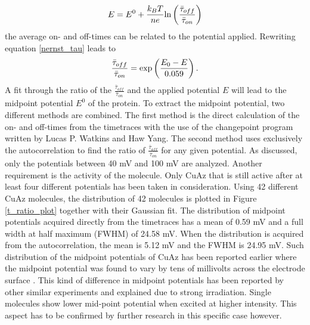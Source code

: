\documentclass[twoside,single]{lion-msc}
\begin{document}
\begin{equation}\label{nernst_tau}
E = E^{0}+\frac{k_{B}T}{ne}\textup{ln}\left ( \frac{\bar{\tau}_{off}}{\bar{\tau}_{on}} \right )
\end{equation}
the average on- and off-times can be related to the potential applied. Rewriting equation \ref{nernst_tau} leads to
\begin{equation}\label{fit_onoff}
\frac{\bar{\tau}_{off}}{\bar{\tau}_{on}} = \textup{exp}\left ( \frac{E_{0}-E}{0.059} \right ).
\end{equation}
A fit through the ratio of the $\frac{\bar{\tau}_{off}}{\bar{\tau}_{on}}$ and the applied potential $E$ will lead to the midpoint potential $E^{0}$ of the protein. To extract the midpoint potential, two different methods are combined. The first method is the direct calculation of the on- and off-times from the timetraces with the use of the changepoint program written by  Lucas P. Watkins and Haw Yang. The second method uses exclusively the autocorrelation to find the ratio of  $\frac{\bar{\tau}_{off}}{\bar{\tau}_{on}}$ for any given potential. As discussed, only the potentials between 40 mV and 100 mV are analyzed. Another requirement is the activity of the molecule. Only CuAz that is still active after at least four different potentials has been taken in consideration. Using 42 different CuAz molecules, the distribution of 42 molecules is plotted in Figure \ref{t_ratio_plot} together with their Gaussian fit. The distribution of midpoint potentials acquired directly from the timetraces has a mean of 0.59 mV and a full width at half maximum (FWHM) of 24.58 mV. When the distribution is acquired from the autocorrelation, the mean is 5.12 mV and the FWHM is 24.95 mV. Such distribution of the midpoint potentials of CuAz has been reported earlier \cite{Salverda2010} where the midpoint potential was found to vary by tens of millivolts across the electrode surface   . This kind of difference in midpoint potentials has been reported by other similar experiments \cite{Zhang2017} and explained due to strong irradiation. Single molecules show lower mid-point potential when excited at higher intensity. This aspect has to be confirmed by further research in this specific case however. 
\end{document}
